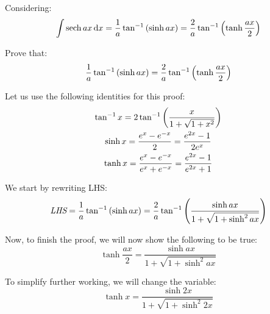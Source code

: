 \documentclass{article}
\begin{document}
\thispagestyle{plain}
\MakeCustomTitle
\bigskip


\begin{QuestionFrame}
    Considering:
    \begin{equation*}
        \int{\sech{ax} \,\diff{x}}
            = \frac{1}{a} \tan^{-1}{\parens*{\sinh{ax}}}
            = \frac{2}{a} \tan^{-1}{\parens*{\tanh{\frac{ax}{2}}}}
    \end{equation*}
    
    Prove that:
    \begin{equation*}
        \frac{1}{a} \tan^{-1}{\parens*{\sinh{ax}}}
            = \frac{2}{a} \tan^{-1}{\parens*{\tanh{\frac{ax}{2}}}}
    \end{equation*}
\end{QuestionFrame}

Let us use the following identities for this proof:
\begin{gather*}
    \tan^{-1}{x} = 2 \tan^{-1}{\parens*{\frac{x}{1 + \sqrt{1 + x^2}}}} \\
    \sinh{x} = \frac{e^x - e^{-x}}{2} = \frac{e^{2x} - 1}{2 e^x} \\
    \tanh{x} = \frac{e^x - e^{-x}}{e^x + e^{-x}} = \frac{e^{2x} - 1}{e^{2x} + 1}
\end{gather*}

We start by rewriting LHS:
\begin{equation*}
    \lhs
        = \frac{1}{a} \tan^{-1}{\parens*{\sinh{ax}}}
        = \frac{2}{a} \tan^{-1}{\parens*{\frac{\sinh{ax}}{1 + \sqrt{1 + \sinh^2{ax}}}}} 
\end{equation*}

Now, to finish the proof, we will now show the following to be true:
\begin{equation*}
    \tanh{\frac{ax}{2}} = \frac{\sinh{ax}}{1 + \sqrt{1 + \sinh^2{ax}}}
\end{equation*}

To simplify further working, we will change the variable:
\begin{equation*}
    \tanh{x} = \frac{\sinh{2x}}{1 + \sqrt{1 + \sinh^2{2x}}}
\end{equation*}
\end{document}
